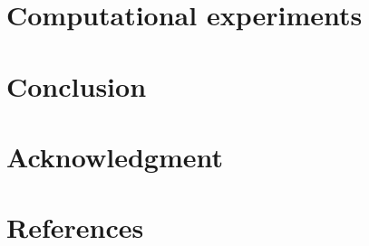 \documentclass[review]{elsarticle}
\begin{document}
\section{Computational experiments}

\section{Conclusion}

\section{Acknowledgment}

\section{References}


\end{document}
